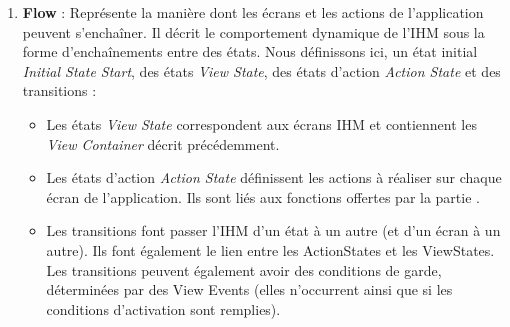 \begin{enumerate}
\item \textbf{Flow} : Représente la manière dont les écrans et les actions de l'application peuvent s'enchaîner. Il décrit le comportement dynamique de l'\textsc{IHM} sous la forme d'enchaînements entre des états. Nous définissons ici, un état initial \textit{Initial State Start}, des états \textit{View State}, des états d'action \textit{Action State} et des transitions :
\begin{itemize}
\item Les états \textit{View State} correspondent aux écrans \textsc{IHM} et contiennent les \textit{View Container} décrit précédemment.
\item Les états d'action \textit{Action State} définissent les actions à réaliser sur chaque écran de l'application. Ils sont liés aux fonctions offertes par la partie \kwsoa{}.
\item Les transitions  font passer l'\textsc{IHM} d'un état à un autre (et d'un écran à un autre). Ils font également le lien entre les ActionStates et les ViewStates. Les transitions peuvent également avoir des conditions de garde, déterminées par des View Events (elles n'occurrent ainsi que si les conditions d'activation sont remplies).

\end{itemize}
\end{enumerate}       


